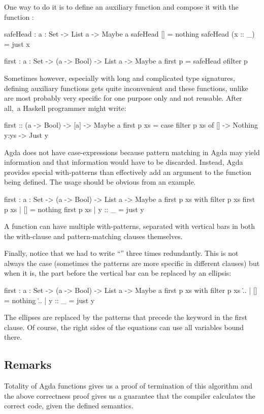 One way to do it is to define an auxiliary function and compose it with the function
:
\begin{code}
  safeHead : {a : Set} -> List a -> Maybe a
  safeHead [] = nothing
  safeHead (x :: _) = just x
  
  first : {a : Set} -> (a -> Bool) -> List a -> Maybe a
  first p = safeHead \o filter p
\end{code}
Sometimes however, especially with long and complicated type signatures,
defining auxiliary functions gets quite inconvenient and these functions,
unlike  are most probably very specific for one purpose only
and not reusable. After all,~a Haskell programmer might write:
\begin{code}
  first :: (a -> Bool) -> [a] -> Maybe a
  first p xs = case filter p xs of
    [] -> Nothing
    y:ys -> Just y
\end{code}
Agda does not have case-expressions because pattern matching in Agda may yield
information and that information would have to be discarded. Instead, Agda provides special
with-patterns than effectively add an argument to the function being defined. The
usage should be obvious from an example.
\begin{code}
  first : {a : Set} -> (a -> Bool) -> List a -> Maybe a
  first p xs with filter p xs
  first p xs | [] = nothing
  first p xs | y :: _ = just y
\end{code}
A function can have multiple with-patterns, separated with vertical bars in both the
with-clause and pattern-matching clauses themselves.

Finally, notice that we had to write ``'' three times redundantly.
This is not always the case (sometimes the patterns are more specific in different
clauses) but when it is, the part before the vertical bar can be replaced by an ellipsis:
\begin{code}
  first : {a : Set} -> (a -> Bool) -> List a -> Maybe a
  first p xs with filter p xs
  \... | [] = nothing
  \... | y :: _ = just y
\end{code}
The ellipses are replaced by the patterns that precede the keyword  in the first
clause. Of course, the right sides of the equations can use all variables bound
there.

\subsection{Remarks}

Totality of Agda functions gives us a proof of termination of this algorithm and
the above correctness proof gives us a guarantee that the compiler calculates
the correct code, given the defined semantics.

